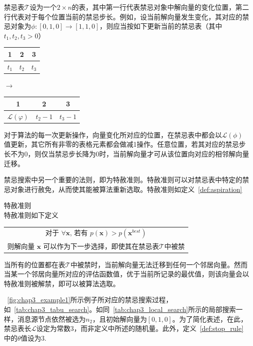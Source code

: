 禁忌表$\mathcal{T}$设为一个$2\times n$的表，其中第一行代表禁忌对象中解向量的变化位置，第二行代表对于每个位置当前的禁忌步长。例如，设当前解向量发生变化，其对应的禁忌对象为$\phi:[0,1,0]\rightarrow[1,1,0]$，则应当按如下更新当前的禁忌表（其中$t_1,t_2,t_3>0$）
\begin{center}
\begin{tabular}{|c|c|c|}
\hline
1 & 2 & 3 \\
\hline
$t_1$ & $t_2$ & $t_3$ \\
\hline
\end{tabular} $\longrightarrow$
\begin{tabular}{|c|c|c|}
\hline
1 & 2 & 3 \\
\hline
$\mathcal{L}(\varphi)$ & $t_2-1$ & $t_3-1$ \\
\hline
\end{tabular}
\end{center}
对于算法的每一次更新操作，向量变化所对应的位置，在禁忌表中都会以$\mathcal{L}(\phi)$值更新，其它所有非零的表格元素都会做减1操作。任意位置，若其对应的禁忌步长不为0，则仅当禁忌步长降为0时，当前解向量才可从该位置向对应的相邻解向量迁移。

禁忌搜索中另一个重要的法则，即为特赦准则。特赦准则可以对禁忌表中特定的禁忌对象进行赦免，从而使其能被算法重新选取。特赦准则如定义~\ref{def:aspiration}

\begin{definition} 特赦准则\\
特赦准则如下定义
\begin{center}
\begin{tabular}{|c|}
\hline
对于 $\forall\bm{x}$, 若有 $p(\textbf{x})>p(\textbf{x}^{best})$ \\
则解向量 $\textbf{x}$ 可以作为下一步选择，即使其在禁忌表$\mathcal{T}$中被禁 \\
\hline
\end{tabular}
\end{center}
\label{def:aspiration}
\end{definition}

当所有的位置都在表$\mathcal{T}$中被禁时，当前解向量无法迁移到任何一个邻居向量。然而当某一个邻居向量所对应的评估函数值，优于当前所记录的最优值，则该向量会以特赦准则被解禁，即可以被算法选取。

\figurename~\ref{fig:chap3_example1}所示例子所对应的禁忌搜索过程，如\figurename~\ref{tab:chap3_tabu_search}。如同\tablename~\ref{tab:chap3_local_search}所示的局部搜索一样，消息源节点依然被选为$n_2$，且初始解向量为$[0,1,0]$。为了简化表述，在此，禁忌表长$\mathcal{L}$设定为常数$3$，而非定义中所述的随机量。此外，定义~\ref{def:stop_rule}中的$\theta$值设为$3$.

